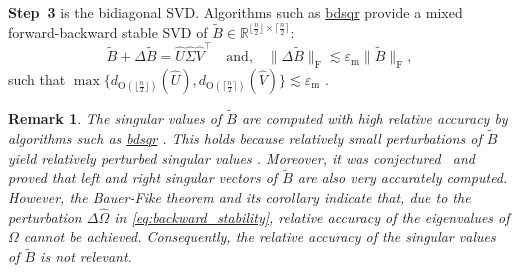 \documentclass[10pt,twoside,dvipsnames]{siamart1116}
\numberwithin{algorithm}{section}
\newtheorem{remark}[theorem]{Remark}
\numberwithin{equation}{section}
\begin{document}
\textbf{Step~3} is the bidiagonal SVD. Algorithms such as \href{https://www.netlib.org/lapack//explore-html/d6/d51/group__bdsqr_gade20fbf9c91aa7de0c3d565b39588dc5.html}{bdsqr} provide a mixed forward-backward stable SVD of $\widetilde{B}\in\mathbb{R}^{\lfloor\frac{n}{2}\rfloor\times \lceil\frac{n}{2}\rceil}$:
	\begin{equation*}
	\widetilde{B} + \Delta\widetilde{B} = \widehat{U}\widehat{\Sigma} \widehat{V}^\top\quad \text{and,}\quad \|\Delta\widetilde{B}\|_\mathrm{F}\lesssim\varepsilon_\mathrm{m} \|\widetilde{B}\|_\mathrm{F},
	\end{equation*}
	such that $\max\{d_{\mathrm{O}(\lfloor\frac{n}{2}\rfloor)}(\widehat{U}),d_{\mathrm{O}(\lceil\frac{n}{2}\rceil)}(\widehat{V})\}\lesssim \varepsilon_\mathrm{m}$ \cite{lapack99, DemmelKahan90}. 
	\begin{remark}
	\emph{The singular values of $\widetilde{B}$ are computed with high \emph{relative} accuracy by algorithms such as \href{https://www.netlib.org/lapack//explore-html/d6/d51/group__bdsqr_gade20fbf9c91aa7de0c3d565b39588dc5.html}{bdsqr} \cite[Thm.~6~and~7]{DemmelKahan90}. This holds because relatively small perturbations of $\widetilde{B}$ yield relatively perturbed singular values \cite[Chap.~4.3]{dhillon1997new}. Moreover, it was conjectured~\cite{DemmelKahan90} and proved \cite[Thm.~6.1]{Deift91} that left and right singular vectors of $\widetilde{B}$ are also very accurately computed. %
However, the Bauer-Fike theorem \cite[Thm.~6.3.2]{horn13} and its corollary \cite[Cor.~6.3.4]{horn13} indicate that, due to the perturbation $\Delta\widehat{\Omega}$ in \eqref{eq:backward_stability}, relative accuracy of the eigenvalues of $\Omega$ cannot be achieved. Consequently, the relative accuracy of the singular values of $\widetilde{B}$ is not relevant.}
	\end{remark}
	
\end{document}
